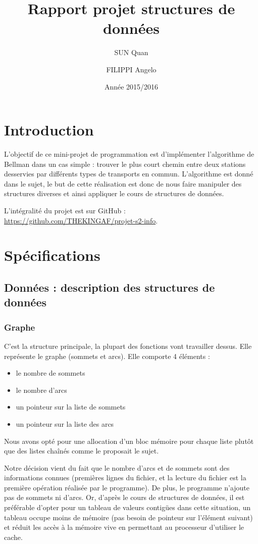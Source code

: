 \documentclass{report}
\title{Rapport projet structures de données}
\author{SUN Quan \and FILIPPI Angelo}
\date{Année 2015/2016}
\begin{document}
\maketitle

\tableofcontents

\chapter{Introduction}\indent

L’objectif de ce mini-projet de programmation est d’implémenter l’algorithme de Bellman dans un cas simple : trouver le plus court chemin entre deux stations desservies par différents types de transports en commun. L’algorithme est donné dans le sujet, le but de cette réalisation est donc de nous faire manipuler des structures diverses et ainsi appliquer le cours de structures de données.

L'intégralité du projet est sur GitHub : \url{https://github.com/THEKINGAF/projet-s2-info}.

\chapter{Spécifications}
\section{Données : description des structures de données}
\subsection{Graphe}

C’est la structure principale, la plupart des fonctions vont travailler dessus. Elle représente le graphe (sommets et arcs).
Elle comporte 4 éléments :

\begin{itemize}
\item le nombre de sommets
\item le nombre d’arcs
\item un pointeur sur la liste de sommets
\item un pointeur sur la liste des arcs
\end{itemize}

\bigskip 
Nous avons opté pour une allocation d’un bloc mémoire pour chaque liste plutôt que des listes chaînés comme le proposait le sujet. 

Notre décision vient du fait que le nombre d’arcs et de sommets sont des informations connues (premières lignes du fichier, et la lecture du fichier est la première opération réalisée par le programme). De plus, le programme n’ajoute pas de sommets ni d’arcs. Or, d’après le cours de structures de données, il est préférable d’opter pour un tableau de valeurs contigües dans cette situation, un tableau occupe moins de mémoire (pas besoin de pointeur sur l’élément suivant) et réduit les accès à la mémoire vive en permettant au processeur d’utiliser le cache.
\end{document}
